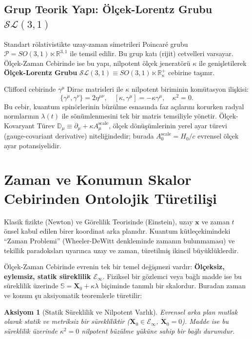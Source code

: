 \documentclass[11pt,a4paper]{article}
\newtheorem{axiom}{Aksiyom}[section]
\begin{document}
\subsection{Grup Teorik Yapı: Ölçek-Lorentz Grubu $\mathcal{SL}(3,1)$}
Standart rölativistikte uzay-zaman simetrileri Poincaré grubu $\mathcal{P} = SO(3,1) \ltimes \mathbb{R}^{3,1}$ ile temsil edilir. Bu grup katı (rijit) cetvelleri varsayar. Ölçek-Zaman Cebirinde ise bu yapı, nilpotent ölçek jeneratörü $\kappa$ ile genişletilerek \textbf{Ölçek-Lorentz Grubu} $\mathcal{SL}(3,1) \equiv SO(3,1) \ltimes \mathbb{R}^+_\kappa$ cebirine taşınır.

Clifford cebirinde $\gamma^\mu$ Dirac matrisleri ile $\kappa$ nilpotent biriminin komütasyon ilişkisi:
\begin{equation}
    \{\gamma^\mu, \gamma^\nu\} = 2\eta^{\mu\nu}, \quad [\kappa, \gamma^\mu] = -\kappa \gamma^\mu, \quad \kappa^2 = 0.
    \label{eq:clifford_scale}
\end{equation}
Bu cebir, kuantum spinörlerinin büzülme esnasında faz açılarını korurken radyal normlarının $\lambda(t)$ ile sönümlenmesini tek bir matris temsiliyle yönetir. Ölçek-Kovaryant Türev $\mathbb{D}_\mu \equiv \partial_\mu + \kappa A_\mu^{\mathrm{scale}}$, ölçek dönüşümlerinin yerel ayar türevi (gauge-covariant derivative) niteliğindedir; burada $A_0^{\mathrm{scale}} = H_0/c$ evrensel ölçek ayar potansiyelidir.


\section{Zaman ve Konumun Skalor Cebirinden Ontolojik Türetilişi}
\label{sec:zaman_konum_turetilis}

Klasik fizikte (Newton) ve Görelilik Teorisinde (Einstein), uzay $\mathbf{x}$ ve zaman $t$ önsel kabul edilen birer koordinat arka planıdır. Kuantum kütleçekimindeki ``Zaman Problemi'' (Wheeler-DeWitt denkleminde zamanın bulunmaması) ve tekillik paradoksları uyarınca uzay ve zaman, türetilmiş ikincil büyüklüklerdir.

Ölçek-Zaman Cebirinde evrenin tek bir temel değişmezi vardır: \textbf{Ölçeksiz, eylemsiz, statik süreklilik $\mathcal{E}_\infty$}. Fiziksel bir gözlemci veya bağlı madde ise bu süreklilik üzerinde $\mathbb{S} = \mathbf{X}_0 + \kappa \lambda$ biçiminde tanımlı bir skalordur. Buradan zaman ve konum şu aksiyomatik teoremlerle türetilir:

\begin{axiom}[Statik Süreklilik ve Nilpotent Varlık]
    \label{ax:statik_sureklilik_sc}
    Evrensel arka plan mutlak olarak statik ve metriksiz bir sürekliliktir ($\mathbf{X}_0 \in \mathcal{E}_\infty$, $\dot{\mathbf{X}}_0 = 0$). Madde ise bu süreklilik üzerinde $\kappa^2 = 0$ nilpotent büzülme yüküne sahip bir bağlı durumdur.
\end{axiom}
\end{document}
